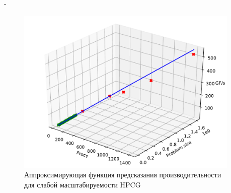 \documentclass[unicode, t, 11pt]{beamer}%
\newlength{\mylen}
\begin{document}
\begin{frame}
\begin{columns}[T]
\begin{column}{\mylen}
		 			\end{column}
		 			\begin{column}{\dimexpr\textwidth-\mylen}
			 			\begin{figure}
							\captionsetup{font=tiny, labelfont=tiny}
							\includegraphics[width=\textwidth]{./images/bbb1}%
							\caption{Аппроксимирующая функция предсказания производительности для слабой масштабируемости HPCG}
						\end{figure}
					\end{column}
		 		\end{columns}
			\end{frame}
		
\end{document}
